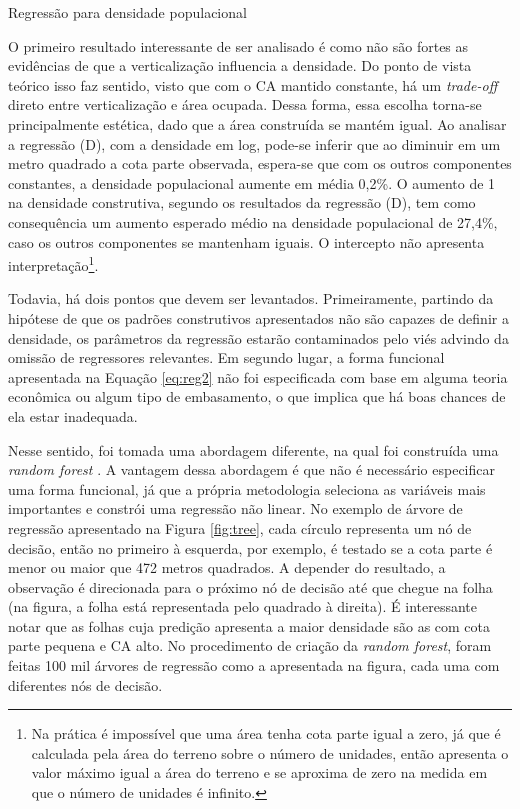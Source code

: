 \begin{table}[h]
    \caption{Regressão para densidade populacional}
    
    \label{tab:reg}
    \addtocounter{table}{-1}
\end{table}

O primeiro resultado interessante de ser analisado é como não são fortes as evidências de que a verticalização influencia a densidade. Do ponto de vista teórico isso faz sentido, visto que com o CA mantido constante, há um \textit{trade-off} direto entre verticalização e área ocupada. Dessa forma, essa escolha torna-se principalmente estética, dado que a área construída se mantém igual. Ao analisar a regressão (D), com a densidade em log, pode-se inferir que ao diminuir em um metro quadrado a cota parte observada, espera-se que com os outros componentes constantes, a densidade populacional aumente em média 0,2\%. O aumento de 1 na densidade construtiva, segundo os resultados da regressão (D), tem como consequência um aumento esperado médio na densidade populacional de 27,4\%, caso os outros componentes se mantenham iguais. O intercepto não apresenta interpretação\footnote{Na prática é impossível que uma área tenha cota parte igual a zero, já que é calculada pela área do terreno sobre o número de unidades, então apresenta o valor máximo igual a área do terreno e se aproxima de zero na medida em que o número de unidades é infinito.}.

Todavia, há dois pontos que devem ser levantados. Primeiramente, partindo da hipótese de que os padrões construtivos apresentados não são capazes de definir a densidade, os parâmetros da regressão estarão contaminados pelo viés advindo da omissão de regressores relevantes. Em segundo lugar, a forma funcional apresentada na Equação \ref{eq:reg2} não foi especificada com base em alguma teoria econômica ou algum tipo de embasamento, o que implica que há boas chances de ela estar inadequada.

Nesse sentido, foi tomada uma abordagem diferente, na qual foi construída uma \textit{random forest} \cite{wright2015ranger}. A vantagem dessa abordagem é que não é necessário especificar uma forma funcional, já que a própria metodologia seleciona as variáveis mais importantes e constrói uma regressão não linear. No exemplo de árvore de regressão apresentado na Figura \ref{fig:tree}, cada círculo representa um nó de decisão, então no primeiro à esquerda, por exemplo, é testado se a cota parte é menor ou maior que 472 metros quadrados. A depender do resultado, a observação é direcionada para o próximo nó de decisão até que chegue na folha (na figura, a folha está representada pelo quadrado à direita). É interessante notar que as folhas cuja predição apresenta a maior densidade são as com cota parte pequena e CA alto. No procedimento de criação da \textit{random forest}, foram feitas 100 mil árvores de regressão como a apresentada na figura, cada uma com diferentes nós de decisão. 

